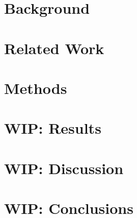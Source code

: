 \section*{Background}
 
\section*{Related Work}
 
\section*{Methods} 
 
\section*{WIP: Results}
 
\section*{WIP: Discussion} 
 
\section*{WIP: Conclusions}
 
